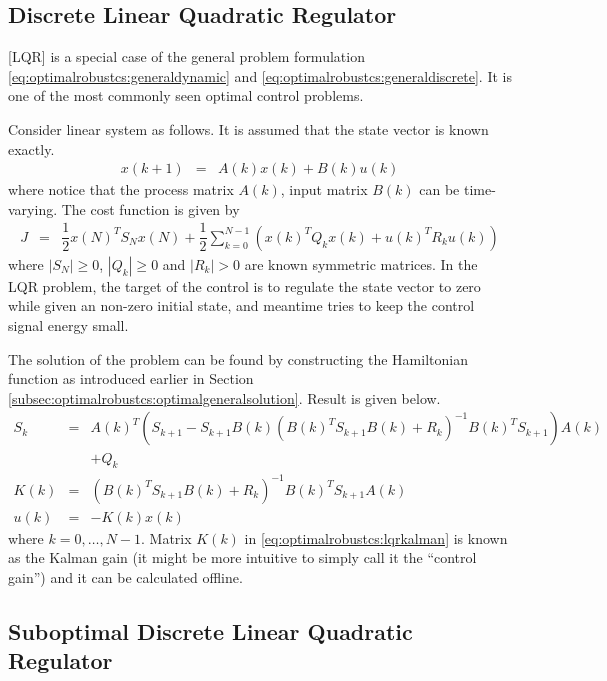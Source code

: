 \subsection{Discrete Linear Quadratic Regulator}

[LQR] is a special case of the general problem formulation \eqref{eq:optimalrobustcs:generaldynamic} and \eqref{eq:optimalrobustcs:generaldiscrete}. It is one of the most commonly seen optimal control problems.

Consider linear system as follows. It is assumed that the state vector is known exactly.
\begin{eqnarray}
	x(k+1) &=& A(k)x(k) + B(k)u(k) \nonumber
\end{eqnarray}
where notice that the process matrix $A(k)$, input matrix $B(k)$ can be time-varying. The cost function is given by
\begin{eqnarray}
	J &=& \dfrac{1}{2}x(N)^TS_Nx(N) + \dfrac{1}{2}\sum_{k=0}^{N-1}\left(x(k)^TQ_kx(k) + u(k)^TR_ku(k)\right) \nonumber
\end{eqnarray}
where $|S_N|\geq 0$, $|Q_k| \geq 0$ and $|R_k| >0$ are known symmetric matrices. In the LQR problem, the target of the control is to regulate the state vector to zero while given an non-zero initial state, and meantime tries to keep the control signal energy small.

The solution of the problem can be found by constructing the Hamiltonian function as introduced earlier in Section \ref{subsec:optimalrobustcs:optimalgeneralsolution}. Result is given below.
\begin{eqnarray}
	S_k &=& A(k)^T\left(S_{k+1}-S_{k+1}B(k)\left(B(k)^TS_{k+1}B(k) + R_k\right)^{-1}B(k)^TS_{k+1}\right)A(k)  \nonumber \\ && + Q_k \label{eq:optimalrobustcs:srecursive} \\
	K(k) &=& \left(B(k)^TS_{k+1}B(k) + R_k\right)^{-1}B(k)^TS_{k+1}A(k) \label{eq:optimalrobustcs:lqrkalman} \\
	u(k) &=& -K(k)x(k) \nonumber
\end{eqnarray}
where $k=0,\ldots, N-1$. Matrix $K(k)$ in \eqref{eq:optimalrobustcs:lqrkalman} is known as the Kalman gain (it might be more intuitive to simply call it the ``control gain'') and it can be calculated offline.

\subsection{Suboptimal Discrete Linear Quadratic Regulator} \label{subsec:suboptimaldiscretelqr}

